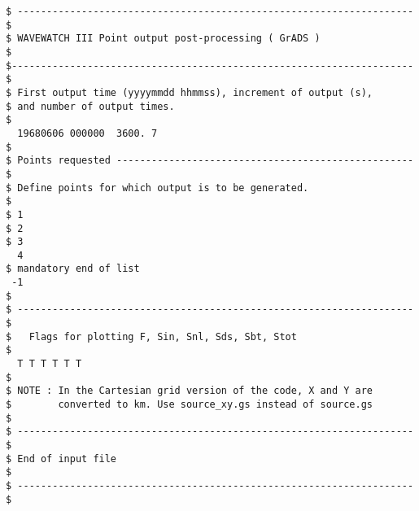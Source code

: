 \begin{verbatim}
$ -------------------------------------------------------------------- $
$ WAVEWATCH III Point output post-processing ( GrADS )                 $
$--------------------------------------------------------------------- $
$ First output time (yyyymmdd hhmmss), increment of output (s), 
$ and number of output times.
$
  19680606 000000  3600. 7
$
$ Points requested --------------------------------------------------- $
$ Define points for which output is to be generated. 
$
$ 1
$ 2
$ 3
  4
$ mandatory end of list
 -1
$
$ -------------------------------------------------------------------- $
$   Flags for plotting F, Sin, Snl, Sds, Sbt, Stot
$
  T T T T T T 
$
$ NOTE : In the Cartesian grid version of the code, X and Y are
$        converted to km. Use source_xy.gs instead of source.gs
$
$ -------------------------------------------------------------------- $
$ End of input file                                                    $
$ -------------------------------------------------------------------- $
\end{verbatim}
